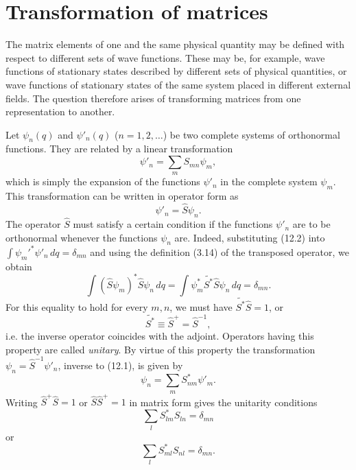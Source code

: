 \section{Transformation of matrices}

The matrix elements of one and the same physical quantity may be defined with
respect to different sets of wave functions. These may be, for example, wave
functions of stationary states described by different sets of physical
quantities, or wave functions of stationary states of the same system placed
in different external fields. The question therefore arises of transforming
matrices from one representation to another.

Let $\psi_n(q)$ and $\psi'_n(q)$ ($n=1,2,\ldots$) be two complete systems of
orthonormal functions. They are related by a linear transformation
\begin{equation}
  \psi'_n=\sum_m S_{mn}\psi_m,
  \tag{12.1}
\end{equation}
which is simply the expansion of the functions $\psi'_n$ in the complete
system $\psi_m$. This transformation can be written in operator form as
\begin{equation}
  \psi'_n=\hat S\psi_n.
  \tag{12.2}
\end{equation}
The operator $\hat S$ must satisfy a certain condition if the functions
$\psi'_n$ are to be orthonormal whenever the functions $\psi_n$ are.
Indeed, substituting (12.2) into
$\int\psi_m'^*\psi'_n\,dq=\delta_{mn}$ and using the definition (3.14) of the
transposed operator, we obtain
\[
  \int(\hat S\psi_m)^*\hat S\psi_n\,dq
  =\int\psi_m^*\tilde{S^*}\hat S\psi_n\,dq=\delta_{mn}.
\]
For this equality to hold for every $m,n$, we must have
$\tilde{S^*}\hat S=1$, or
\begin{equation}
  \tilde{S^*}\equiv\hat S^+=\hat S^{-1},
  \tag{12.3}
\end{equation}
i.e. the inverse operator coincides with the adjoint. Operators having this
property are called \textit{unitary}. By virtue of this property the
transformation $\psi_n=\hat S^{-1}\psi'_n$, inverse to (12.1), is given by
\begin{equation}
  \psi_n=\sum_m S_{nm}^*\psi'_m.
  \tag{12.4}
\end{equation}
Writing $\hat S^+\hat S=1$ or $\hat S\hat S^+=1$ in matrix form gives the
unitarity conditions
\begin{equation}
  \sum_l S_{lm}^*S_{ln}=\delta_{mn}
  \tag{12.5}
\end{equation}
or
\begin{equation}
  \sum_l S_{ml}^*S_{nl}=\delta_{mn}.
  \tag{12.6}
\end{equation}

